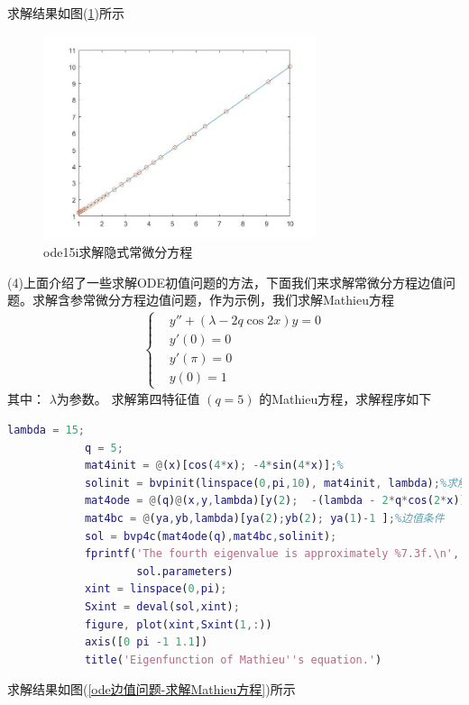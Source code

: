 	        求解结果如图(\ref{ode15i求解隐式常微分方程})所示
			\begin{figure}[H]
	        \centering
	        \includegraphics[width=8cm]{images/ode15iyinshifanghceng.jpg}
	        \caption{ode15i求解隐式常微分方程}
	        \label{ode15i求解隐式常微分方程}
	        \end{figure}
	        \par
	        (4)上面介绍了一些求解ODE初值问题的方法，下面我们来求解常微分方程边值问题。求解含参常微分方程边值问题，作为示例，我们求解Mathieu方程
	        \begin{align*}
			\left\{
			\begin{aligned}
			& y''+(\lambda-2q\cos2x)y=0\\
			& y'(0) = 0\\
			& y'(\pi)=0\\
			& y(0)=1
			\end{aligned}
			\right.
	        \end{align*}
	        其中： $\lambda$为参数。 求解第四特征值 $(q = 5)$ 的Mathieu方程，求解程序如下
	        \begin{lstlisting}[language = Matlab]
			lambda = 15;
			q = 5;
			mat4init = @(x)[cos(4*x); -4*sin(4*x)];%
			solinit = bvpinit(linspace(0,pi,10), mat4init, lambda);%求解迭代初始值。挑选一个满足y'(0)=0,y'(pi)=0,y(0)=1的函数（cos4x）,-4sin(4x)为其导数
			mat4ode = @(q)@(x,y,lambda)[y(2);  -(lambda - 2*q*cos(2*x))*y(1) ];%微分方程匿名函数句柄
			mat4bc = @(ya,yb,lambda)[ya(2);yb(2); ya(1)-1 ];%边值条件
			sol = bvp4c(mat4ode(q),mat4bc,solinit);
			fprintf('The fourth eigenvalue is approximately %7.3f.\n',...
			        sol.parameters)
			xint = linspace(0,pi);
			Sxint = deval(sol,xint);
			figure, plot(xint,Sxint(1,:))
			axis([0 pi -1 1.1])
			title('Eigenfunction of Mathieu''s equation.')
	        \end{lstlisting}
	        求解结果如图(\ref{ode边值问题-求解Mathieu方程})所示
